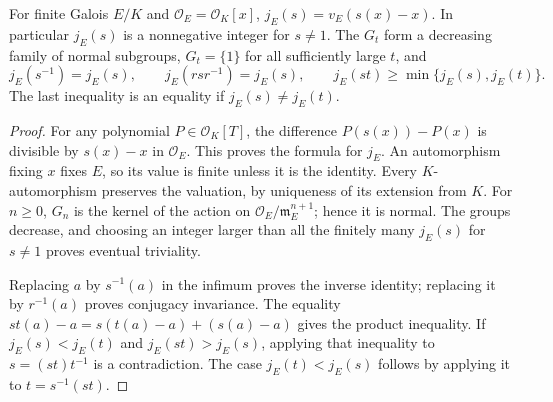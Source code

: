 \begin{lemma}
\label{fw:lower-ramification-properties}
\leanok
For finite Galois $E/K$ and $\mathcal O_E=\mathcal O_K[x]$,
$j_E(s)=v_E(s(x)-x)$. In particular $j_E(s)$ is a nonnegative integer
for $s\ne1$. The $G_t$ form a decreasing family of normal subgroups,
$G_t=\{1\}$ for all sufficiently large $t$, and
\[
 j_E(s^{-1})=j_E(s),\qquad j_E(rsr^{-1})=j_E(s),\qquad
 j_E(st)\geq\min\{j_E(s),j_E(t)\}.
\]
The last inequality is an equality if $j_E(s)\ne j_E(t)$.
\end{lemma}
\begin{proof}
For any polynomial $P\in\mathcal O_K[T]$, the difference
$P(s(x))-P(x)$ is divisible by $s(x)-x$ in $\mathcal O_E$.
This proves the formula for $j_E$. An automorphism fixing $x$ fixes $E$,
so its value is finite unless it is the identity.
Every $K$-automorphism preserves the valuation, by uniqueness of its
extension from $K$. For $n\geq0$, $G_n$ is the kernel of the action
on $\mathcal O_E/\mathfrak m_E^{n+1}$; hence it is normal.
The groups decrease, and choosing an integer larger than all the finitely
many $j_E(s)$ for $s\ne1$ proves eventual triviality.

Replacing $a$ by $s^{-1}(a)$ in the infimum proves the inverse identity;
replacing it by $r^{-1}(a)$ proves conjugacy invariance. The equality
$st(a)-a=s(t(a)-a)+(s(a)-a)$ gives the product inequality.
If $j_E(s)<j_E(t)$ and $j_E(st)>j_E(s)$, applying that inequality to
$s=(st)t^{-1}$ is a contradiction. The case $j_E(t)<j_E(s)$ follows by
applying it to $t=s^{-1}(st)$.
\end{proof}

